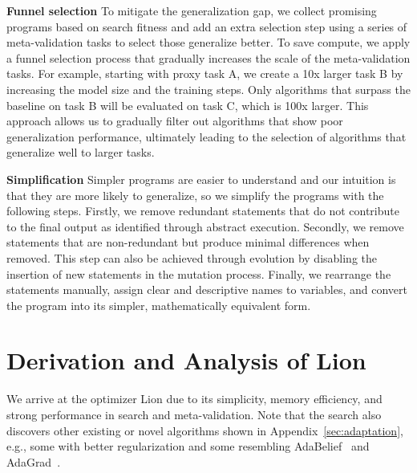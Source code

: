 \documentclass{article}
\newcommand{\name}{Lion}
\begin{document}
\textbf{Funnel selection} 
To mitigate the generalization gap, we collect promising programs based on search fitness and add an extra selection step using a series of meta-validation tasks to select those generalize better.
To save compute, we apply a funnel selection process that gradually increases the scale of the meta-validation tasks. For example, starting with proxy task A, we create a 10x larger task B by increasing the model size and the training steps. Only algorithms that surpass the baseline on task B will be evaluated on task C, which is 100x larger. 
This approach allows us to gradually filter out algorithms that show poor generalization performance, ultimately leading to the selection of algorithms that generalize well to larger tasks.


\textbf{Simplification} 
Simpler programs are easier to understand and our intuition is that they are more likely to generalize, so we simplify the programs with the following steps.
Firstly, we remove redundant statements that do not contribute to the final output as identified through abstract execution. Secondly, we remove statements that are non-redundant but produce minimal differences when removed. This step can also be achieved through evolution by disabling the insertion of new statements in the mutation process. Finally, we rearrange the statements manually, assign clear and descriptive names to variables, and convert the program into its simpler, mathematically equivalent form.






\section{Derivation and Analysis of \name{}}
We arrive at the optimizer \name{} due to its simplicity, memory efficiency, and strong performance in search and meta-validation. 
Note that the search also discovers other existing or novel algorithms shown in Appendix~\ref{sec:adaptation}, e.g., some with better regularization and some resembling AdaBelief~\citep{zhuang2020adabelief} and AdaGrad~\citep{duchi2011adagrad}.
\end{document}
